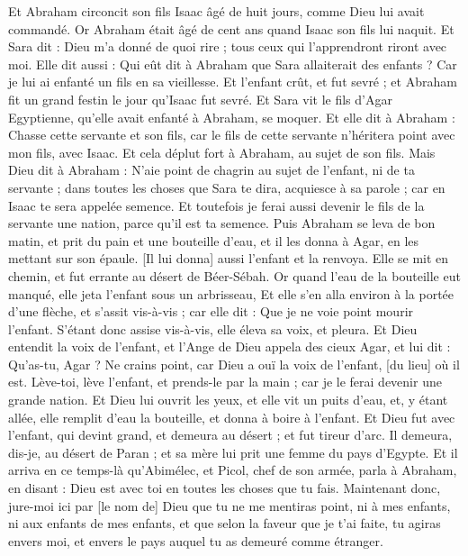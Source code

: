 \begin{multicols}{2}
Et Abraham circoncit son fils Isaac âgé de huit jours, comme Dieu lui avait commandé.
Or Abraham était âgé de cent ans quand Isaac son fils lui naquit.
Et Sara dit : Dieu m'a donné de quoi rire ; tous ceux qui l'apprendront riront avec moi.
Elle dit aussi : Qui eût dit à Abraham que Sara allaiterait des enfants ? Car je lui ai enfanté un fils en sa vieillesse.
Et l'enfant crût, et fut sevré ; et Abraham fit un grand festin le jour qu'Isaac fut sevré.
Et Sara vit le fils d'Agar Egyptienne, qu'elle avait enfanté à Abraham, se moquer.
Et elle dit à Abraham : Chasse cette servante et son fils, car le fils de cette servante n'héritera point avec mon fils, avec Isaac.
Et cela déplut fort à Abraham, au sujet de son fils.
Mais Dieu dit à Abraham : N'aie point de chagrin au sujet de l'enfant, ni de ta servante ; dans toutes les choses que Sara te dira, acquiesce à sa parole ; car en Isaac te sera appelée semence.
Et toutefois je ferai aussi devenir le fils de la servante une nation, parce qu'il est ta semence.
Puis Abraham se leva de bon matin, et prit du pain et une bouteille d'eau, et il les donna à Agar, en les mettant sur son épaule. [Il lui donna] aussi l'enfant et la renvoya. Elle se mit en chemin, et fut errante au désert de Béer-Sébah.
Or quand l'eau de la bouteille eut manqué, elle jeta l'enfant sous un arbrisseau,
Et elle s'en alla environ à la portée d'une flèche, et s'assit vis-à-vis ; car elle dit : Que je ne voie point mourir l'enfant. S'étant donc assise vis-à-vis, elle éleva sa voix, et pleura.
Et Dieu entendit la voix de l'enfant, et l'Ange de Dieu appela des cieux Agar, et lui dit : Qu'as-tu, Agar ? Ne crains point, car Dieu a ouï la voix de l'enfant, [du lieu] où il est.
Lève-toi, lève l'enfant, et prends-le par la main ; car je le ferai devenir une grande nation.
Et Dieu lui ouvrit les yeux, et elle vit un puits d'eau, et, y étant allée, elle remplit d'eau la bouteille, et donna à boire à l'enfant.
Et Dieu fut avec l'enfant, qui devint grand, et demeura au désert ; et fut tireur d'arc.
Il demeura, dis-je, au désert de Paran ; et sa mère lui prit une femme du pays d'Egypte.
Et il arriva en ce temps-là qu'Abimélec, et Picol, chef de son armée, parla à Abraham, en disant : Dieu est avec toi en toutes les choses que tu fais.
Maintenant donc, jure-moi ici par [le nom de] Dieu que tu ne me mentiras point, ni à mes enfants, ni aux enfants de mes enfants, et que selon la faveur que je t'ai faite, tu agiras envers moi, et envers le pays auquel tu as demeuré comme étranger.

\end{multicols}
